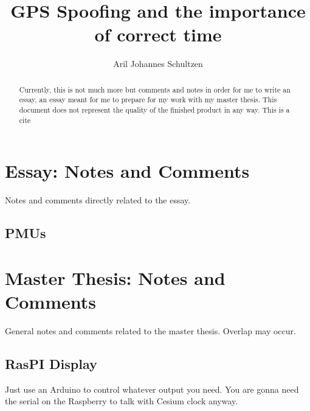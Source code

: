 \documentclass[a4paper,10pt]{article}
\title{GPS Spoofing and the importance of correct time}
\author{Aril Johannes Schultzen}
\begin{document}
\maketitle

\begin{abstract}
Currently, this is not much more but comments and notes in order for me to write an essay, an essay meant for me to prepare for my work with my master thesis. This document does not represent the quality of the finished product in any way. This is a cite \cite{KandR}
\end{abstract}

\section{Essay: Notes and Comments}
Notes and comments directly related to the essay.

\subsection{PMUs}


\section{Master Thesis: Notes and Comments}
General notes and comments related to the master thesis. Overlap may occur.

\subsection{RasPI Display}
Just use an Arduino to control whatever output you need. You are gonna need the serial on the Raspberry to talk with Cesium clock anyway. 
\newpage

\printbibliography[title={Complete Bibliography}]
\end{document}

